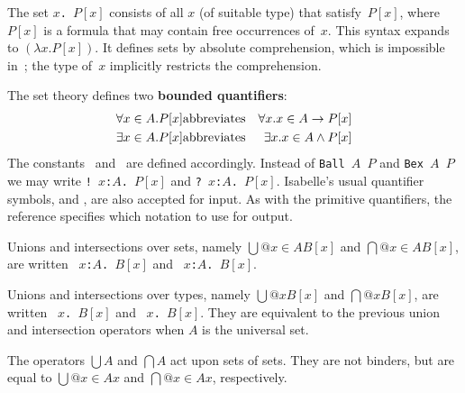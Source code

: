 The set \hbox{\tt{\ttlbrace}$x$. $P[x]${\ttrbrace}} consists of all $x$ (of suitable type)
that satisfy~$P[x]$, where $P[x]$ is a formula that may contain free
occurrences of~$x$.  This syntax expands to $(\lambda
x. P[x])$.  It defines sets by absolute comprehension, which is impossible
in~{\ZF}; the type of~$x$ implicitly restricts the comprehension.

The set theory defines two {\bf bounded quantifiers}:
\begin{eqnarray*}
   \forall x\in A. P[x] &\hbox{abbreviates}& \forall x. x\in A\rightarrow P[x] \\
   \exists x\in A. P[x] &\hbox{abbreviates}& \exists x. x\in A\wedge P[x]
\end{eqnarray*}
The constants~ and~ are defined
accordingly.  Instead of \texttt{Ball $A$ $P$} and \texttt{Bex $A$ $P$} we may
write
%
\hbox{\tt !~$x$:$A$. $P[x]$} and \hbox{\tt ?~$x$:$A$. $P[x]$}.  Isabelle's
usual quantifier symbols,  and , are also accepted
for input.  As with the primitive quantifiers, the {\ML} reference
 specifies which notation to use for output.

Unions and intersections over sets, namely $\bigcup@{x\in A}B[x]$ and
$\bigcap@{x\in A}B[x]$, are written 
~\hbox{\tt$x$:$A$. $B[x]$} and
~\hbox{\tt$x$:$A$. $B[x]$}.  

Unions and intersections over types, namely $\bigcup@x B[x]$ and $\bigcap@x
B[x]$, are written ~\hbox{\tt$x$. $B[x]$} and
~\hbox{\tt$x$. $B[x]$}.  They are equivalent to the previous
union and intersection operators when $A$ is the universal set.

The operators $\bigcup A$ and $\bigcap A$ act upon sets of sets.  They are
not binders, but are equal to $\bigcup@{x\in A}x$ and $\bigcap@{x\in A}x$,
respectively.




